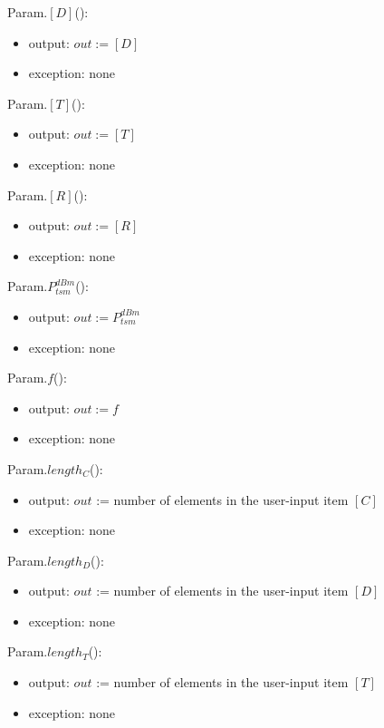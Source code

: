 \documentclass[12pt, titlepage]{article}
\begin{document}
\noindent Param.$[D]$():
\begin{itemize}
\item output: $out := [D]$
\item exception: none
\end{itemize}

\noindent Param.$[T]$():
\begin{itemize}
\item output: $out := [T]$
\item exception: none
\end{itemize}

\noindent Param.$[R]$():
\begin{itemize}
\item output: $out := [R]$
\item exception: none
\end{itemize}

\noindent Param.$P_{tsm}^{dBm}$():
\begin{itemize}
\item output: $out := P_{tsm}^{dBm}$
\item exception: none
\end{itemize}

\noindent Param.$f$():
\begin{itemize}
\item output: $out := f$
\item exception: none
\end{itemize}

\noindent Param.$length_C$():
\begin{itemize}
\item output: $out$ := number of elements in the user-input item $[C]$
\item exception: none
\end{itemize}

\noindent Param.$length_D$():
\begin{itemize}
\item output: $out$ := number of elements in the user-input item $[D]$
\item exception: none
\end{itemize}

\noindent Param.$length_T$():
\begin{itemize}
\item output: $out$ := number of elements in the user-input item $[T]$
\item exception: none
\end{itemize}
\end{document}
